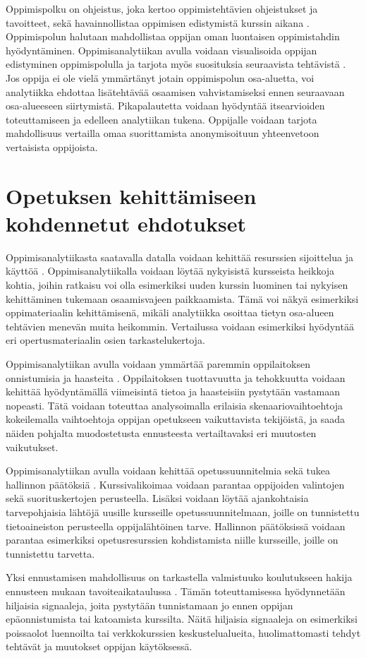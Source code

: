 Oppimispolku on ohjeistus, joka kertoo oppimistehtävien ohjeistukset ja tavoitteet, sekä havainnollistaa oppimisen edistymistä kurssin aikana \citep{toivolaFlippedLearningKaanteinen2017}. Oppimispolun halutaan mahdollistaa oppijan oman luontaisen oppimistahdin hyödyntäminen. Oppimisanalytiikan avulla voidaan visualisoida oppijan edistyminen oppimispolulla ja tarjota myös suosituksia seuraavista tehtävistä \citep{longPenetratingFogAnalytics2011}. Jos oppija ei ole vielä ymmärtänyt jotain oppimispolun osa-aluetta, voi analytiikka ehdottaa lisätehtävää osaamisen vahvistamiseksi ennen seuraavaan osa-alueeseen siirtymistä. Pikapalautetta voidaan hyödyntää itsearvioiden toteuttamiseen ja edelleen analytiikan tukena. Oppijalle voidaan tarjota mahdollisuus vertailla omaa suorittamista anonymisoituun yhteenvetoon vertaisista oppijoista.

\section{Opetuksen kehittämiseen kohdennetut ehdotukset}

Oppimisanalytiikasta saatavalla datalla voidaan kehittää resurssien sijoittelua ja käyttöä \citep{longPenetratingFogAnalytics2011}. Oppimisanalytiikalla voidaan löytää nykyisistä kursseista heikkoja kohtia, joihin ratkaisu voi olla esimerkiksi uuden kurssin luominen tai nykyisen kehittäminen tukemaan osaamisvajeen paikkaamista. Tämä voi näkyä esimerkiksi oppimateriaalin kehittämisenä, mikäli analytiikka osoittaa tietyn osa-alueen tehtävien menevän muita heikommin. Vertailussa voidaan esimerkiksi hyödyntää eri opertusmateriaalin osien tarkastelukertoja.

Oppimisanalytiikan avulla voidaan ymmärtää paremmin oppilaitoksen onnistumisia ja haasteita \citep{longPenetratingFogAnalytics2011}. Oppilaitoksen tuottavuutta ja tehokkuutta voidaan kehittää hyödyntämällä viimeisintä tietoa ja haasteisiin pystytään vastamaan nopeasti. Tätä voidaan toteuttaa analysoimalla erilaisia skenaariovaihtoehtoja kokeilemalla vaihtoehtoja oppijan opetukseen vaikuttavista tekijöistä, ja saada näiden pohjalta muodostetusta ennusteesta vertailtavaksi eri muutosten vaikutukset.

Oppimisanalytiikan avulla voidaan kehittää opetussuunnitelmia sekä tukea hallinnon päätöksiä \citep{romeroEducationalDataMining2010,longPenetratingFogAnalytics2011}. Kurssivalikoimaa voidaan parantaa oppijoiden valintojen sekä suorituskertojen perusteella. Lisäksi voidaan löytää ajankohtaisia tarvepohjaisia lähtöjä uusille kursseille opetussuunnitelmaan, joille on tunnistettu tietoaineiston perusteella oppijalähtöinen tarve. Hallinnon päätöksissä voidaan parantaa esimerkiksi opetusresurssien kohdistamista niille kursseille, joille on tunnistettu tarvetta.

Yksi ennustamisen mahdollisuus on tarkastella valmistuuko koulutukseen hakija ennusteen mukaan tavoiteaikataulussa \citep{barberCourseCorrectionUsing2012a}. Tämän toteuttamisessa hyödynnetään hiljaisia signaaleja, joita pystytään tunnistamaan jo ennen oppijan epäonnistumista tai katoamista kurssilta. Näitä hiljaisia signaaleja on esimerkiksi poissaolot luennoilta tai verkkokurssien keskustelualueita, huolimattomasti tehdyt tehtävät ja muutokset oppijan käytöksessä.
